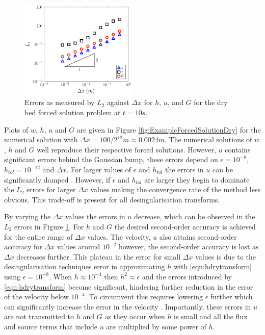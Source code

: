 \documentclass[times]{elsarticle}
\begin{document}
\begin{figure}
	\centering
		\includegraphics[width=0.5\textwidth]{./Figures/Forced/Dry1/L2.pdf}
	\caption{Errors as measured by $L_2$ against $\Delta x$ for $h$, $u$, and $G$ for the dry bed forced solution problem at $t=10s$.}
	\label{fig:L1convergenceforcedWet}
\end{figure}

Plots of $w$, $h$, $u$ and $G$ are given in Figure \ref{fig:ExampleForcedSolutionDry} for the numerical solution with $\Delta x = 100 / 2^{12}m\approx 0.0024m$. The numerical solutions of $w$, $h$ and $G$ well reproduce their respective forced solutions. However, $u$ contains significant errors behind the Gaussian bump, these errors depend on $\epsilon = 10^{-8}$, $h_{{tol}} = 10^{-12}$ and $\Delta x$. For larger values of $\epsilon$ and $h_{{tol}}$ the errors in $u$ can be significantly damped \cite{Kurganov-Petrova-2007-707}. However, if $\epsilon$ and $h_{{tol}}$ are larger they begin to dominate the $L_2$ errors for larger $\Delta x$ values making the convergence rate of the method less obvious. This trade-off is present for all desingularisation transforms.

By varying the $\Delta x$ values the errors in $u$ decrease, which can be observed in the $L_2$ errors in Figure \ref{fig:L1convergenceforcedWet}. For $h$ and $G$ the desired second-order accuracy is achieved for the entire range of $\Delta x$ values. The velocity, $u$ also attains second-order accuracy for $\Delta x$ values around $10^{-2}$ however, the second-order accuracy is lost as $\Delta x$ decreases further. This plateau in the error for small $\Delta x$ values is due to the desingularisation techniques error in approximating $h$ with \eqref{eqn:hdrytransform} using $\epsilon = 10^{-8}$. When $h \approx 10^{-4}$ then $h^2 \approx \epsilon$ and the errors introduced by \eqref{eqn:hdrytransform} become significant, hindering further reduction in the error of the velocity below $10^{-4}$. To circumvent this requires lowering $\epsilon$ further which can significantly increase the error in the velocity \cite{Kurganov-Petrova-2007-707}. Importantly, these errors in $u$ are not transmitted to $h$ and $G$ as they occur when $h$ is small and all the flux and source terms that include $u$ are multiplied by some power of $h$.
\end{document}
